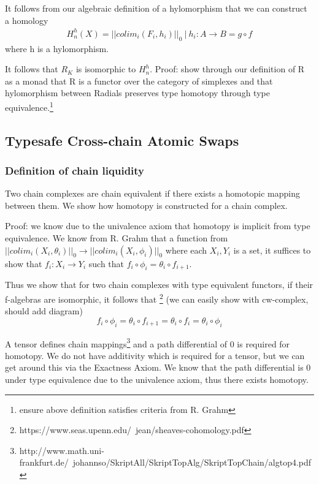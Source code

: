 \documentclass{article}
\begin{document}
It follows from our algebraic definition of a hylomorphism that we can construct a homology
\begin{equation} \label{eq1}
\begin{split}
H^{h}_n(X) = || colim_i (F_i, h_i) ||_0 \ | \ h_i: A \rightarrow B = g \circ f
\end{split}
\end{equation}
where h is a hylomorphism.

It follows that $R_K$ is isomorphic to $H^{h}_n$. Proof: show through our definition of R as a monad that R is a functor over the category of simplexes and that hylomorphism between Radials preserves type homotopy through type equivalence.\footnote{ensure above definition satisfies criteria from R. Grahm}

\subsection{Typesafe Cross-chain Atomic Swaps}
\subsubsection{Definition of chain liquidity}
Two chain complexes are chain equivalent if there exists a homotopic mapping between them. We show how homotopy is constructed for a chain complex.

Proof: we know due to the univalence axiom that homotopy is implicit from type equivalence. We know from R. Grahm that a function from $|| colim_i (X_i,\theta_i) ||_0 \rightarrow || colim_i (X_i,\phi_i) ||_0$ where each $ X_i,Y_i $ is a set, it suffices to show that $f_i: X_i  \rightarrow Y_i$ such that $ f_i \circ \phi_i =  \theta_i \circ f_{i+1}$.

Thus we show that for two chain complexes with type equivalent functors, if their f-algebras are isomorphic, it follows that \footnote{https://www.seas.upenn.edu/~jean/sheaves-cohomology.pdf} (we can easily show with cw-complex, should add diagram)
\begin{equation}
f_i \circ \phi_i =  \theta_i \circ f_{i+1} = \theta_i \circ f_i =  \theta_i \circ \phi_i
\end{equation}

A tensor defines chain mappings\footnote{http://www.math.uni-frankfurt.de/~johannso/SkriptAll/SkriptTopAlg/SkriptTopChain/algtop4.pdf} and a path differential of 0 is required for homotopy. We do not have additivity which is required for a tensor, but we can get around this via the Exactness Axiom. We know that the path differential is 0 under type equivalence due to the univalence axiom, thus there exists homotopy.
\end{document}
